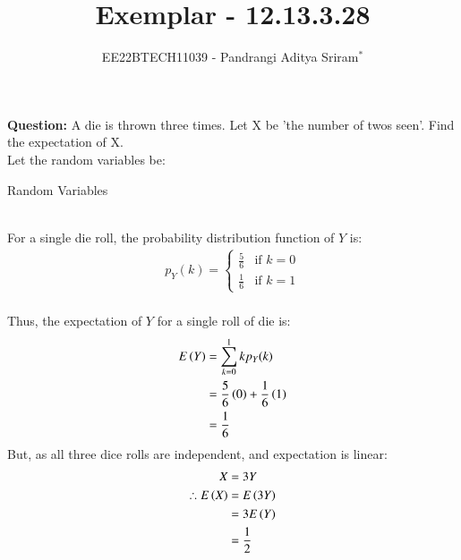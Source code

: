 \documentclass[journal,12pt,twocolumn]{IEEEtran}
\theoremstyle{remark}
\begin{document}

\vspace{3cm}

\title{Exemplar - 12.13.3.28}
\author{EE22BTECH11039 - Pandrangi Aditya Sriram$^{*}$%
}
\maketitle
\newpage
\bigskip

\renewcommand{\thefigure}{\theenumi}
\renewcommand{\thetable}{\theenumi}


\vspace{3cm}
\textbf{Question:} A die is thrown three times. Let X be 'the number of twos seen'. Find the expectation of X.\\
\solution
Let the random variables be:
\begin{table}[h!]
    
    \caption{Random Variables}
    \label{tab:12_13_3_28}
\end{table}\\
For a single die roll, the probability distribution function of $Y$ is:
\begin{align}
    p_Y(k) = 
    \begin{cases}
        \frac{5}{6} & \text{if } k = 0\\
        \frac{1}{6} & \text{if } k = 1
    \end{cases}
\end{align}\\
Thus, the expectation of $Y$ for a single roll of die is:
\begin{align}
    E\left(Y\right) &= \sum_{k = 0}^{1} k p_Y(k) \\
    &= \frac{5}{6}\left(0\right) + \frac{1}{6}\left(1\right)\\
    &= \frac{1}{6}
\end{align}
But, as all three dice rolls are independent, and expectation is linear:
\begin{align}
    X &= 3Y\\
    \therefore E\left(X\right) &= E\left(3Y\right)\\
    &= 3E\left(Y\right) \\
    &= \frac{1}{2}
\end{align}
\end{document}
